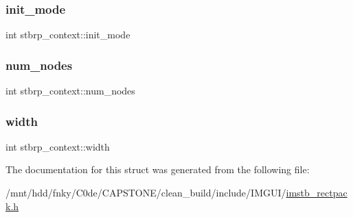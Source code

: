 \mbox{\label{structstbrp__context_a007509feee322404083034e4c2d3dc5d}} 
\subsubsection{\texorpdfstring{init\+\_\+mode}{init\_mode}}
{\footnotesize\ttfamily int stbrp\+\_\+context\+::init\+\_\+mode}

\mbox{\label{structstbrp__context_afa8105d4ef6d3e0ae5aaf8e1ed4b2c58}} 
\subsubsection{\texorpdfstring{num\+\_\+nodes}{num\_nodes}}
{\footnotesize\ttfamily int stbrp\+\_\+context\+::num\+\_\+nodes}

\mbox{\label{structstbrp__context_a70cfcb2044ce8397cc440d28b30c09b2}} 
\subsubsection{\texorpdfstring{width}{width}}
{\footnotesize\ttfamily int stbrp\+\_\+context\+::width}



The documentation for this struct was generated from the following file\+:\begin{DoxyCompactItemize}
\item 
/mnt/hdd/fnky/\+C0de/\+C\+A\+P\+S\+T\+O\+N\+E/clean\+\_\+build/include/\+I\+M\+G\+U\+I/\hyperlink{imstb__rectpack_8h}{imstb\+\_\+rectpack.\+h}\end{DoxyCompactItemize}
